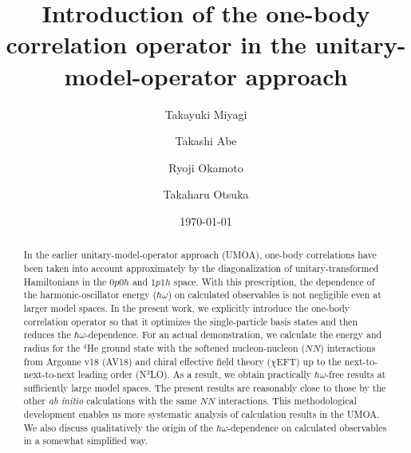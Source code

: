 \documentclass[aps,prc, dvips, twocolumn,groupedaddress,showkeys,showpacs,floatfix,superscriptaddress]{revtex4-1}
\newcommand{\<}{\langle}
\renewcommand{\>}{\rangle}
\begin{document}
\title{Introduction of the one-body correlation operator in the unitary-model-operator approach}
\author{Takayuki Miyagi}
\author{Takashi Abe}
\author{Ryoji Okamoto}
\author{Takaharu Otsuka}

\date{\today}

\begin{abstract}
In the earlier unitary-model-operator approach (UMOA),
one-body correlations have been taken into account
 approximately by the diagonalization of unitary-transformed Hamiltonians in the $0p0h$ and $1p1h$ space.
With this prescription, the dependence of the harmonic-oscillator energy ($\hbar\omega$)
on calculated observables is not negligible even at larger model spaces.
In the present work, we explicitly introduce the one-body correlation operator
so that it optimizes the single-particle basis states and then reduces the $\hbar\omega$-dependence.
For an actual demonstration, we calculate the energy and radius for the $^{4}$He ground state
with the softened nucleon-nucleon ($NN$) interactions from Argonne v18 (AV18)
and chiral effective field theory ($\chi$EFT) up to the next-to-next-to-next leading order (N$^{3}$LO).
As a result, we obtain practically $\hbar\omega$-free results at sufficiently large model spaces.
The present results are reasonably close to those by the other {\em ab initio} calculations with the same $NN$ interactions.
This methodological development enables us more systematic analysis of calculation results in the UMOA.
We also discuss qualitatively the origin of the $\hbar\omega$-dependence on calculated observables
in a somewhat simplified way.
\end{abstract}

\maketitle
\end{document}
